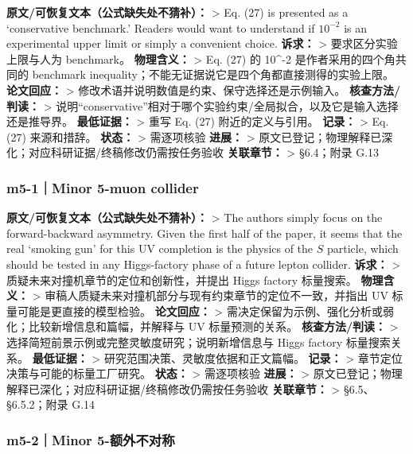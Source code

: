 \documentclass[
]{article}
\begin{document}
\textbf{原文/可恢复文本（公式缺失处不猜补）：} \textgreater{} Eq. (27)
is presented as a `conservative benchmark.' Readers would want to
understand if \(10^{-2}\) is an experimental upper limit or simply a
convenient choice. \textbf{诉求：} \textgreater{} 要求区分实验上限与人为
benchmark。 \textbf{物理含义：} \textgreater{} Eq. (27) 的 10\^{}-2
是作者采用的四个角共同的 benchmark
inequality；不能无证据说它是四个角都直接测得的实验上限。
\textbf{论文回应：} \textgreater{}
修改术语并说明数值是约束、保守选择还是示例输入。
\textbf{核查方法/判读：} \textgreater{}
说明``conservative''相对于哪个实验约束/全局拟合，以及它是输入选择还是推导界。
\textbf{最低证据：} \textgreater{} 重写 Eq. (27) 附近的定义与引用。
\textbf{记录：} \textgreater{} Eq. (27) 来源和措辞。 \textbf{状态：}
\textgreater{} 需逐项核验 \textbf{进展：} \textgreater{}
原文已登记；物理解释已深化；对应科研证据/终稿修改仍需按任务验收
\textbf{关联章节：} \textgreater{} §6.4；附录 G.13

\subsubsection{m5-1｜Minor 5-muon
collider}\label{m5-1minor-5-muon-collider}

\textbf{原文/可恢复文本（公式缺失处不猜补）：} \textgreater{} The
authors simply focus on the forward-backward asymmetry. Given the first
half of the paper, it seems that the real `smoking gun' for this UV
completion is the physics of the \(S\) particle, which should be tested
in any Higgs-factory phase of a future lepton collider. \textbf{诉求：}
\textgreater{} 质疑未来对撞机章节的定位和创新性，并提出 Higgs factory
标量搜索。 \textbf{物理含义：} \textgreater{}
审稿人质疑未来对撞机部分与现有约束章节的定位不一致，并指出 UV
标量可能是更直接的模型检验。 \textbf{论文回应：} \textgreater{}
需决定保留为示例、强化分析或弱化；比较新增信息和篇幅，并解释与 UV
标量预测的关系。 \textbf{核查方法/判读：} \textgreater{}
选择简短前景示例或完整灵敏度研究；说明新增信息与 Higgs factory
标量搜索关系。 \textbf{最低证据：} \textgreater{}
研究范围决策、灵敏度依据和正文篇幅。 \textbf{记录：} \textgreater{}
章节定位决策与可能的标量工厂研究。 \textbf{状态：} \textgreater{}
需逐项核验 \textbf{进展：} \textgreater{}
原文已登记；物理解释已深化；对应科研证据/终稿修改仍需按任务验收
\textbf{关联章节：} \textgreater{} §6.5、§6.5.2；附录 G.14

\subsubsection{m5-2｜Minor
5-额外不对称}\label{m5-2minor-5-ux989dux5916ux4e0dux5bf9ux79f0}
\end{document}
